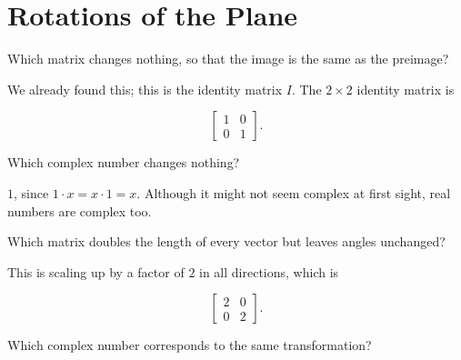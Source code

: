 \documentclass[../key.tex]{subfiles}
\begin{document}
\section{Rotations of the Plane}

\newcommand{\Mat}{\operatorname{M}}

\begin{outer_problem}[start=1]
\item \label{prob:pr_start}
\end{outer_problem}

\begin{inner_problem}[start=1]
\item Which matrix changes nothing, so that the image is the same as the preimage?
\end{inner_problem}

We already found this; this is the identity matrix $I$. The $2\times 2$ identity matrix is

$$\begin{bmatrix} 1 & 0 \\ 0 & 1 \end{bmatrix}.$$

\begin{inner_problem}
\item Which complex number changes nothing?
\end{inner_problem}

$1$, since $1\cdot x = x\cdot 1 = x$. Although it might not seem complex at first sight, real numbers are complex too.

\begin{outer_problem}
\item
\end{outer_problem}

\begin{inner_problem}[start=1]
\item Which matrix doubles the length of every vector but leaves angles unchanged?
\end{inner_problem}

This is scaling up by a factor of $2$ in all directions, which is

$$\begin{bmatrix} 2 & 0 \\ 0 & 2 \end{bmatrix}.$$

\begin{inner_problem}
\item Which complex number corresponds to the same transformation?
\end{inner_problem}
\end{document}

